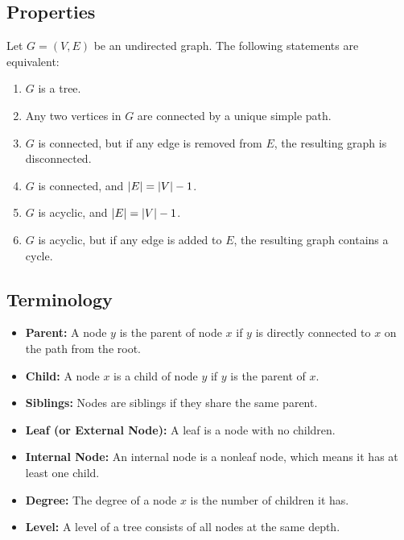 \documentclass{article}
\begin{document}
\subsection{Properties}
\begin{definition}
    Let $G=(V,E)$ be an undirected graph. The following statements are equivalent:
    \begin{enumerate}
        \item $G$ is a tree. 
        \item Any two vertices in $G$ are connected by a unique simple path. 
        \item $G$ is connected, but if any edge is removed from $E$, the resulting graph is disconnected. 
        \item $G$ is connected, and $\abs{E} = \abs{V} - 1$.
        \item $G$ is acyclic, and $\abs{E} = \abs{V} - 1$.
        \item $G$ is acyclic, but if any edge is added to $E$, the resulting graph contains a cycle.
    \end{enumerate}
\end{definition}

\subsection{Terminology}
\begin{terminology}
    \begin{itemize}            
        \item \textbf{Parent:} A node \( y \) is the parent of node \( x \) if \( y \) is directly connected to \( x \) on the path from the root.
        
        \item \textbf{Child:} A node \( x \) is a child of node \( y \) if \( y \) is the parent of \( x \).
        
        \item \textbf{Siblings:} Nodes are siblings if they share the same parent.
        
        \item \textbf{Leaf (or External Node):} A leaf is a node with no children.
        
        \item \textbf{Internal Node:} An internal node is a nonleaf node, which means it has at least one child.
        
        \item \textbf{Degree:} The degree of a node \( x \) is the number of children it has.
        
        \item \textbf{Level:} A level of a tree consists of all nodes at the same depth.
        
    \end{itemize}
\end{terminology}
\end{document}
